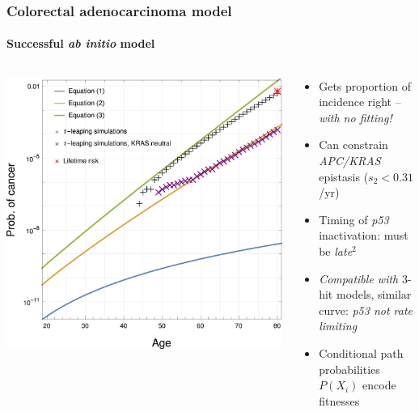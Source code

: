 \documentclass{beamer}
\begin{document}
\begin{frame}
    \frametitle{Colorectal adenocarcinoma model}
    \framesubtitle{Successful \emph{ab initio} model}
    \begin{columns}
        \begin{column}{0.5\textwidth}
        \includegraphics[width=\textwidth]{figures/F2.large.jpg}
        \end{column}
        \begin{column}{0.5\textwidth}
        \begin{itemize}
            \item Gets proportion of incidence right -- \emph{with no fitting!}
            \item Can constrain \emph{APC/KRAS} epistasis ($s_{2} < 0.31$/yr)
            \item Timing of \emph{p53} inactivation: must be \emph{late}${}^2$
            \item \emph{Compatible with} 3-hit models, similar curve: 
                  \emph{p53 not rate limiting}
            \item Conditional path probabilities $P(X_i)$ encode fitnesses
        \end{itemize}
        \end{column}
    \end{columns}
\end{frame}
\end{document}
